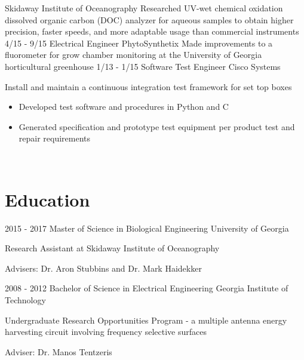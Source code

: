 \documentclass[]{cv}
\begin{document}
\begin{body}
\begin{entrylist}
		{Skidaway Institute of Oceanography}
		{Researched UV-wet chemical oxidation dissolved organic carbon (DOC) analyzer for aqueous samples to obtain higher precision, faster speeds, and more adaptable usage than commercial instruments
		}
		\entry
		{4/15 - 9/15}
		{Electrical Engineer}
		{PhytoSynthetix}
		{Made improvements to a fluorometer for grow chamber monitoring at the University of Georgia horticultural greenhouse}
		\entry
		{1/13 - 1/15}
		{Software Test Engineer}
		{Cisco Systems}
		{Install and maintain a continuous integration test framework for set top boxes
			\begin{itemize}
				\item {Developed test software and procedures in Python and C}
				\item {Generated specification and prototype test equipment per product test and repair requirements}
			\end{itemize}
		}
	\end{entrylist}
	~
	\section{Education\\}
	\begin{entrylist}
		\entry
		{2015 - 2017}
		{Master of Science in Biological Engineering}
		{University of Georgia}
		{Research Assistant at Skidaway Institute of Oceanography
			\begin{description}
				\item {Advisers: Dr. Aron Stubbins and Dr. Mark Haidekker}
			\end{description}}
		\entry
		{2008 - 2012}
		{Bachelor of Science in Electrical Engineering}
		{Georgia Institute of Technology}
		{
			Undergraduate Research Opportunities Program - a multiple antenna energy harvesting circuit involving frequency selective surfaces
			\begin{description}
				\item {Adviser: Dr. Manos Tentzeris}
			\end{description}
		}
	\end{entrylist}
	~
	\newpage

\end{body}
\end{document}
